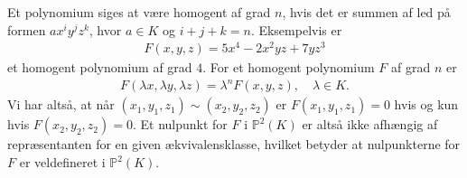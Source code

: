 Et polynomium siges at være homogent af grad $n$, hvis det er summen af led på formen $ax^i y^j z^k$, hvor $a \in K$ og $i + j + k = n$. Eksempelvis er 
\begin{align*}
	F(x, y, z) = 5x^4 - 2x^2 yz + 7yz^3
\end{align*}
et homogent polynomium af grad $4$. For et homogent polynomium $F$ af grad $n$ er
\begin{align*}
	F(\lambda x, \lambda y, \lambda z) = \lambda^n F(x, y, z), \quad \lambda \in K.
\end{align*}
Vi har altså, at når $(x_1, y_1, z_1) \sim (x_2, y_2, z_2)$ er $F(x_1, y_1, z_1) = 0$ hvis og kun hvis $F(x_2, y_2, z_2) = 0$. Et nulpunkt for $F$ i $\mathbb{P}^{2}(K)$ er altså ikke afhængig af repræsentanten for en given ækvivalensklasse, hvilket betyder at nulpunkterne for $F$ er veldefineret i $\mathbb{P}^{2}(K)$.

